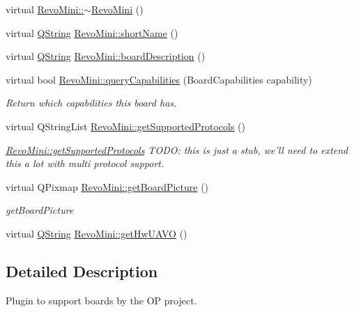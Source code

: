 \begin{DoxyCompactItemize}
virtual \hyperlink{group___boards___open_pilot_plugin_ga6e4458ca98fbe0ed1501b324c934af47}{\-Revo\-Mini\-::$\sim$\-Revo\-Mini} ()
\item 
virtual \hyperlink{group___u_a_v_objects_plugin_gab9d252f49c333c94a72f97ce3105a32d}{\-Q\-String} \hyperlink{group___boards___open_pilot_plugin_ga927253b30c15894799a8f99f632aec03}{\-Revo\-Mini\-::short\-Name} ()
\item 
virtual \hyperlink{group___u_a_v_objects_plugin_gab9d252f49c333c94a72f97ce3105a32d}{\-Q\-String} \hyperlink{group___boards___open_pilot_plugin_ga721fb37ca43a4eaa930682025c96b24d}{\-Revo\-Mini\-::board\-Description} ()
\item 
virtual bool \hyperlink{group___boards___open_pilot_plugin_ga5bf154e46cfe882c67dd2e851b4195c7}{\-Revo\-Mini\-::query\-Capabilities} (\-Board\-Capabilities capability)
\begin{DoxyCompactList}\small\item\em \-Return which capabilities this board has. \end{DoxyCompactList}\item 
virtual \-Q\-String\-List \hyperlink{group___boards___open_pilot_plugin_gaf820a526d814e3f0d11e403bc2c89f60}{\-Revo\-Mini\-::get\-Supported\-Protocols} ()
\begin{DoxyCompactList}\small\item\em \hyperlink{group___boards___open_pilot_plugin_gaf820a526d814e3f0d11e403bc2c89f60}{\-Revo\-Mini\-::get\-Supported\-Protocols} \-T\-O\-D\-O\-: this is just a stub, we'll need to extend this a lot with multi protocol support. \end{DoxyCompactList}\item 
virtual \-Q\-Pixmap \hyperlink{group___boards___open_pilot_plugin_ga63ad5a29a4010dcb3e00f6e0383e741f}{\-Revo\-Mini\-::get\-Board\-Picture} ()
\begin{DoxyCompactList}\small\item\em get\-Board\-Picture \end{DoxyCompactList}\item 
virtual \hyperlink{group___u_a_v_objects_plugin_gab9d252f49c333c94a72f97ce3105a32d}{\-Q\-String} \hyperlink{group___boards___open_pilot_plugin_gae959e2f2bea464d785957b6198a8c9c9}{\-Revo\-Mini\-::get\-Hw\-U\-A\-V\-O} ()
\end{DoxyCompactItemize}


\subsection{\-Detailed \-Description}
\-Plugin to support boards by the \-O\-P project. 

